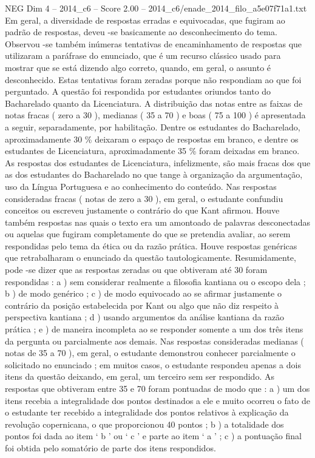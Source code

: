 \begin{textsample}{NEG Dim 4 – 2014\_c6 – Score 2.00 – 2014\_c6/enade\_2014\_filo\_a5e07f71a1.txt}
Em geral, a diversidade de respostas erradas e equivocadas, que fugiram ao padrão de respostas, deveu -se basicamente ao desconhecimento do tema.
Observou -se também inúmeras tentativas de encaminhamento de respostas que utilizaram a paráfrase do enunciado, que é um recurso clássico usado para mostrar que se está dizendo algo correto, quando, em geral, o assunto é desconhecido.
Estas tentativas foram zeradas porque não respondiam ao que foi perguntado.
A questão foi respondida por estudantes oriundos tanto do Bacharelado quanto da Licenciatura.
A distribuição das notas entre as faixas de notas fracas ( zero a 30 ), medianas ( 35 a 70 ) e boas ( 75 a 100 ) é apresentada a seguir, separadamente, por habilitação.
Dentre os estudantes do Bacharelado, aproximadamente 30 \% deixaram o espaço de respostas em branco, e dentre os estudantes de Licenciatura, aproximadamente 35 \% foram deixadas em branco.
As respostas dos estudantes de Licenciatura, infelizmente, são mais fracas dos que as dos estudantes do Bacharelado no que tange à organização da argumentação, uso da Língua Portuguesa e ao conhecimento do conteúdo.
Nas respostas consideradas fracas ( notas de zero a 30 ), em geral, o estudante confundiu conceitos ou escreveu justamente o contrário do que Kant afirmou.
Houve também respostas nas quais o texto era um amontoado de palavras desconectadas ou aquelas que fugiram completamente do que se pretendia avaliar, ao serem respondidas pelo tema da ética ou da razão prática.
Houve respostas genéricas que retrabalharam o enunciado da questão tautologicamente.
Resumidamente, pode -se dizer que as respostas zeradas ou que obtiveram até 30 foram respondidas : a ) sem considerar realmente a filosofia kantiana ou o escopo dela ; b ) de modo genérico ; c ) de modo equivocado ao se afirmar justamente o contrário da posição estabelecida por Kant ou algo que não diz respeito à perspectiva kantiana ; d ) usando argumentos da análise kantiana da razão prática ; e ) de maneira incompleta ao se responder somente a um dos três itens da pergunta ou parcialmente aos demais.
Nas respostas consideradas medianas ( notas de 35 a 70 ), em geral, o estudante demonstrou conhecer parcialmente o solicitado no enunciado ; em muitos casos, o estudante respondeu apenas a dois itens da questão deixando, em geral, um terceiro sem ser respondido.
As respostas que obtiveram entre 35 e 70 foram pontuadas de modo que : a ) um dos itens recebia a integralidade dos pontos destinados a ele e muito ocorreu o fato de o estudante ter recebido a integralidade dos pontos relativos à explicação da revolução copernicana, o que proporcionou 40 pontos ; b ) a totalidade dos pontos foi dada ao item ‘ b ’ ou ‘ c ’ e parte ao item ‘ a ’ ; c ) a pontuação final foi obtida pelo somatório de parte dos itens respondidos.

\end{textsample}
